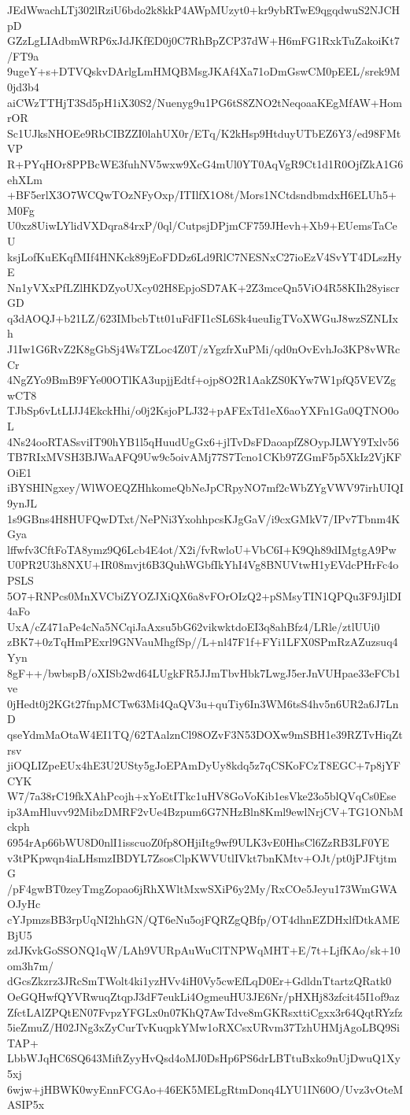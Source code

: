 JEdWwachLTj302lRziU6bdo2k8kkP4AWpMUzyt0+kr9ybRTwE9qgqdwuS2NJCHpD
GZzLgLIAdbmWRP6xJdJKfED0j0C7RhBpZCP37dW+H6mFG1RxkTuZakoiKt7/FT9a
9ugeY+s+DTVQskvDArlgLmHMQBMsgJKAf4Xa71oDmGswCM0pEEL/srek9M0jd3b4
aiCWzTTHjT3Sd5pH1iX30S2/Nuenyg9u1PG6tS8ZNO2tNeqoaaKEgMfAW+HomrOR
Sc1UJksNHOEe9RbCIBZZI0lahUX0r/ETq/K2kHsp9HtduyUTbEZ6Y3/ed98FMtVP
R+PYqHOr8PPBcWE3fuhNV5wxw9XcG4mUl0YT0AqVgR9Ct1d1R0OjfZkA1G6ehXLm
+BF5erlX3O7WCQwTOzNFyOxp/ITIlfX1O8t/Mors1NCtdsndbmdxH6ELUh5+M0Fg
U0xz8UiwLYlidVXDqra84rxP/0ql/CutpsjDPjmCF759JHevh+Xb9+EUemsTaCeU
ksjLofKuEKqfMIf4HNKck89jEoFDDz6Ld9RlC7NESNxC27ioEzV4SvYT4DLszHyE
Nn1yVXxPfLZlHKDZyoUXcy02H8EpjoSD7AK+2Z3mceQn5ViO4R58KIh28yiscrGD
q3dAOQJ+b21LZ/623IMbcbTtt01uFdFI1cSL6Sk4ueuIigTVoXWGuJ8wzSZNLIxh
J1Iw1G6RvZ2K8gGbSj4WsTZLoc4Z0T/zYgzfrXuPMi/qd0nOvEvhJo3KP8vWRcCr
4NgZYo9BmB9FYe00OTlKA3upjjEdtf+ojp8O2R1AakZS0KYw7W1pfQ5VEVZgwCT8
TJbSp6vLtLIJJ4EkckHhi/o0j2KsjoPLJ32+pAFExTd1eX6aoYXFn1Ga0QTNO0oL
4Ns24ooRTASsviIT90hYB1l5qHuudUgGx6+jlTvDsFDaoapfZ8OypJLWY9Txlv56
TB7RIxMVSH3BJWaAFQ9Uw9c5oivAMj77S7Tcno1CKb97ZGmF5p5XkIz2VjKFOiE1
iBYSHINgxey/WlWOEQZHhkomeQbNeJpCRpyNO7mf2cWbZYgVWV97irhUIQI9ynJL
1s9GBns4H8HUFQwDTxt/NePNi3YxohhpcsKJgGaV/i9cxGMkV7/IPv7Tbnm4KGya
lffwfv3CftFoTA8ymz9Q6Lcb4E4ot/X2i/fvRwloU+VbC6I+K9Qh89dIMgtgA9Pw
U0PR2U3h8NXU+IR08mvjt6B3QuhWGbfIkYhI4Vg8BNUVtwH1yEVdcPHrFc4oPSLS
5O7+RNPcs0MnXVCbiZYOZJXiQX6a8vFOrOIzQ2+pSMsyTIN1QPQu3F9JjlDI4aFo
UxA/cZ471aPe4cNa5NCqiJaAxsu5bG62vikwktdoEI3q8ahBfz4/LRle/ztlUUi0
zBK7+0zTqHmPExrl9GNVauMhgfSp//L+nl47F1f+FYi1LFX0SPmRzAZuzsuq4Yyn
8gF++/bwbspB/oXISb2wd64LUgkFR5JJmTbvHbk7LwgJ5erJnVUHpae33eFCb1ve
0jHedt0j2KGt27fnpMCTw63Mi4QaQV3u+quTiy6In3WM6tsS4hv5n6UR2a6J7LnD
qseYdmMaOtaW4EI1TQ/62TAalznCl98OZvF3N53DOXw9mSBH1e39RZTvHiqZtrsv
jiOQLIZpeEUx4hE3U2USty5gJoEPAmDyUy8kdq5z7qCSKoFCzT8EGC+7p8jYFCYK
W7/7a38rC19fkXAhPcojh+xYoEtITkc1uHV8GoVoKib1esVke23o5blQVqCs0Ese
ip3AmHluvv92MibzDMRF2vUe4Bzpum6G7NHzBln8Kml9ewlNrjCV+TG1ONbMckph
6954rAp66bWU8D0nlI1isscuoZ0fp8OHjiItg9wf9ULK3vE0HhsCl6ZzRB3LF0YE
v3tPKpwqn4iaLHsmzIBDYL7ZsosClpKWVUtlIVkt7bnKMtv+OJt/pt0jPJFtjtmG
/pF4gwBT0zeyTmgZopao6jRhXWltMxwSXiP6y2My/RxCOe5Jeyu173WmGWAOJyHc
cYJpmzsBB3rpUqNI2hhGN/QT6eNu5ojFQRZgQBfp/OT4dhnEZDHxlfDtkAMEBjU5
zdJKvkGoSSONQ1qW/LAh9VURpAuWuClTNPWqMHT+E/7t+LjfKAo/sk+10om3h7m/
dGcsZkzrz3JRcSmTWolt4ki1yzHVv4iH0Vy5cwEfLqD0Er+GdldnTtartzQRatk0
OeGQHwfQYVRwuqZtqpJ3dF7eukLi4OgmeuHU3JE6Nr/pHXHj83zfcit45I1of9az
ZfctLAlZPQtEN07FvpzYFGLx0n07KhQ7AwTdve8mGKRsxttiCgxx3r64QqtRYzfz
5ieZmuZ/H02JNg3xZyCurTvKuqpkYMw1oRXCsxURvm37TzhUHMjAgoLBQ9SiTAP+
LbbWJqHC6SQ643MiftZyyHvQsd4oMJ0DsHp6PS6drLBTtuBxko9nUjDwuQ1Xy5xj
6wjw+jHBWK0wyEnnFCGAo+46EK5MELgRtmDonq4LYU1IN60O/Uvz3vOteMASIP5x
